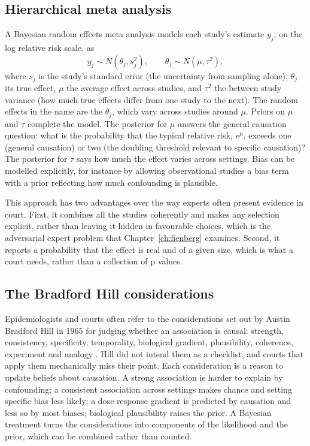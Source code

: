 \subsection{Hierarchical meta analysis}

A Bayesian random effects meta analysis models each study's estimate $y_j$, on the log relative risk scale, as
\begin{equation}
y_j \sim N(\theta_j, s_j^2), \qquad \theta_j \sim N(\mu, \tau^2),
\label{eq:meta}
\end{equation}
where $s_j$ is the study's standard error (the uncertainty from sampling alone), $\theta_j$ its true effect, $\mu$ the average effect across studies, and $\tau^2$ the between study variance (how much true effects differ from one study to the next). The random effects in the name are the $\theta_j$, which vary across studies around $\mu$. Priors on $\mu$ and $\tau$ complete the model. The posterior for $\mu$ answers the general causation question: what is the probability that the typical relative risk, $e^{\mu}$, exceeds one (general causation) or two (the doubling threshold relevant to specific causation)? The posterior for $\tau$ says how much the effect varies across settings. Bias can be modelled explicitly, for instance by allowing observational studies a bias term with a prior reflecting how much confounding is plausible.

This approach has two advantages over the way experts often present evidence in court. First, it combines all the studies coherently and makes any selection explicit, rather than leaving it hidden in favourable choices, which is the adversarial expert problem that Chapter~\ref{ch:fienberg} examines. Second, it reports a probability that the effect is real and of a given size, which is what a court needs, rather than a collection of p values.

\subsection{The Bradford Hill considerations}

Epidemiologists and courts often refer to the considerations set out by Austin Bradford Hill in 1965 for judging whether an association is causal: strength, consistency, specificity, temporality, biological gradient, plausibility, coherence, experiment and analogy \citep{hill1965}. Hill did not intend them as a checklist, and courts that apply them mechanically miss their point. Each consideration is a reason to update beliefs about causation. A strong association is harder to explain by confounding; a consistent association across settings makes chance and setting specific bias less likely; a dose response gradient is predicted by causation and less so by most biases; biological plausibility raises the prior. A Bayesian treatment turns the considerations into components of the likelihood and the prior, which can be combined rather than counted.

